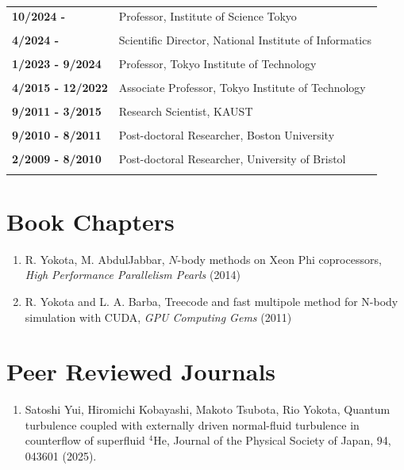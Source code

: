 \documentclass[margin,line]{cv}
\begin{document}
\begin{resume}
\begin{tabular}{ll}
{\bf 10/2024 - } & Professor, Institute of Science Tokyo\\ \\

{\bf 4/2024 - } & Scientific Director, National Institute of Informatics\\ \\

{\bf 1/2023 - 9/2024} & Professor, Tokyo Institute of Technology\\ \\

{\bf 4/2015 - 12/2022} & Associate Professor, Tokyo Institute of Technology\\ \\

{\bf 9/2011 - 3/2015}& Research Scientist, KAUST\\ \\

{\bf 9/2010 - 8/2011}& Post-doctoral Researcher, Boston University\\ \\

{\bf 2/2009 - 8/2010}& Post-doctoral Researcher, University of Bristol\\ \\

\end{tabular}

\section{\sc Book Chapters}
\begin{enumerate}
\item R. Yokota, M. AbdulJabbar,
$N$-body methods on Xeon Phi coprocessors,
{\it High Performance Parallelism Pearls} (2014)

\item R. Yokota and L. A. Barba,
Treecode and fast multipole method for N-body simulation with CUDA,
{\it GPU Computing Gems} (2011)
\end{enumerate}

\section{\sc Peer Reviewed Journals}
\begin{enumerate}
\item Satoshi Yui, Hiromichi Kobayashi, Makoto Tsubota, Rio Yokota, Quantum turbulence coupled with externally driven normal-fluid turbulence in counterflow of superfluid $^4$He, Journal of the Physical Society of Japan, 94, 043601 (2025).


\end{enumerate}
\end{resume}
\end{document}
